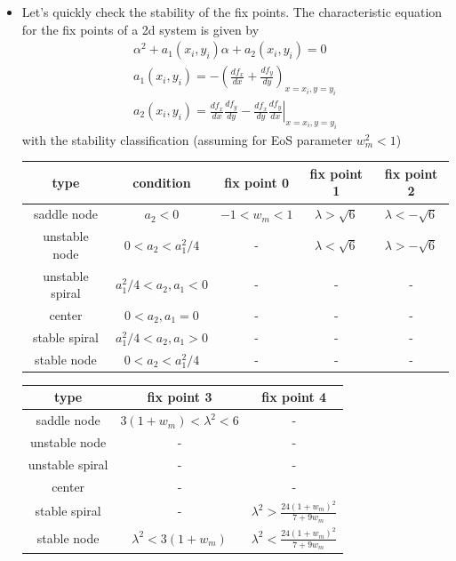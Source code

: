 \documentclass[10pt,a4paper]{book}
\theoremstyle{definition}
\begin{document}
\begin{itemize}
\item Let's quickly check the stability of the fix points. The characteristic equation for the fix points of a 2d system is given by
\begin{align}
    \alpha^2+a_1(x_i,y_i)\alpha+a_2(x_i,y_i)=0\\
    a_1(x_i,y_i)=-\left(\frac{df_x}{dx}+\frac{df_y}{dy}\right)_{x=x_i,y=y_i}\\
    a_2(x_i,y_i)=\left.\frac{df_x}{dx}\frac{df_y}{dy}-\frac{df_x}{dy}\frac{df_y}{dx}\right|_{x=x_i,y=y_i}
\end{align}
with the stability classification (assuming for EoS parameter $w_m^2<1$)
\begin{center}
\begin{tabular}{ c c c c c}
\hline\hline
 type            & condition            & fix point 0 & fix point 1 & fix point 2   \\ \hline
 saddle node     & $a_2<0$              & $-1<w_m<1$ & $\lambda>\sqrt{6}$ & $\lambda<-\sqrt{6}$\\  
 unstable node   & $0<a_2<a_1^2/4$      & - & $\lambda<\sqrt{6}$ & $\lambda>-\sqrt{6}$\\  
 unstable spiral & $a_1^2/4<a_2, a_1<0$ & - & - & -\\
 center          & $0<a_2, a_1=0$       & - & - & -\\
 stable spiral   & $a_1^2/4<a_2, a_1>0$ & - & - & -\\
 stable node     & $0<a_2<a_1^2/4$      & - & - & -\\ \hline\hline
\end{tabular}
\end{center}

\begin{center}
\begin{tabular}{ c c c }
\hline\hline
 type            & fix point 3 & fix point 4  \\ \hline
 saddle node     & $3(1+w_m)<\lambda^2<6$ & -\\  
 unstable node   & - & -\\
 unstable spiral & - & -\\
 center          & - & -\\
 stable spiral   & - & $\lambda^2>\frac{24(1+w_m)^2}{7+9w_m}$\\
 stable node     & $\lambda^2<3(1+w_m)$ & $\lambda^2<\frac{24(1+w_m)^2}{7+9w_m}$ \\ \hline\hline
\end{tabular}
\end{center}

\end{itemize} 
\end{document}
